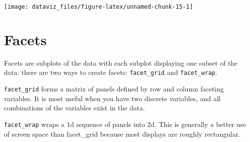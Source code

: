 \documentclass[]{book}
\theoremstyle{definition}
\theoremstyle{definition}
\theoremstyle{definition}
\theoremstyle{remark}
\begin{document}
\begin{center}\texttt{[image: dataviz\_files/figure-latex/unnamed-chunk-15-1]} \end{center}

\hypertarget{facets}{%
\section{Facets}\label{facets}}

Facets are subplots of the data with each subplot displaying one subset
of the data. there are two ways to create facets: \texttt{facet\_grid}
and \texttt{facet\_wrap}.

\texttt{facet\_grid} forms a matrix of panels defined by row and column
faceting variables. It is most useful when you have two discrete
variables, and all combinations of the variables exist in the data.

\texttt{facet\_wrap} wraps a 1d sequence of panels into 2d. This is
generally a better use of screen space than facet\_grid because most
displays are roughly rectangular.
\end{document}
